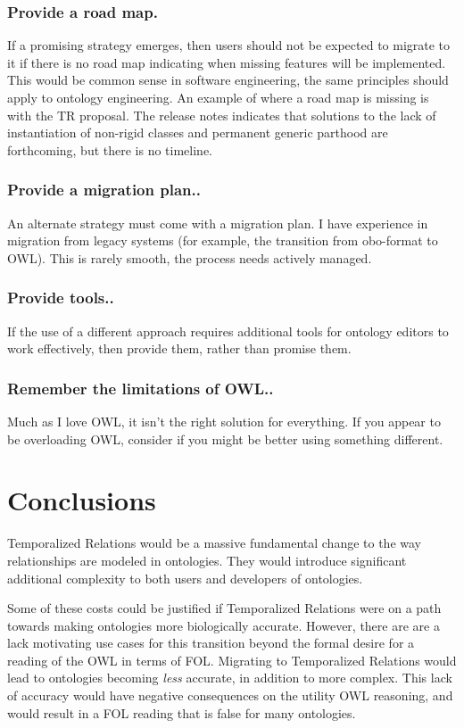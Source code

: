 \documentclass{bioinfo}
\begin{document}
\subsubsection{Provide a road map.} If a promising strategy emerges,
then users should not be expected to migrate to it if there is no road
map indicating when missing features will be implemented. This would
be common sense in software engineering, the same principles should
apply to ontology engineering.  An example of where a road map is
missing is with the TR proposal. The release notes indicates that
solutions to the lack of instantiation of non-rigid classes and
permanent generic parthood are forthcoming, but there is no timeline.

\subsubsection{Provide a migration plan..} An alternate strategy must
come with a migration plan. I have experience in migration from legacy
systems (for example, the transition from obo-format to OWL). This is
rarely smooth, the process needs actively managed.

\subsubsection{Provide tools..} If the use of a different approach
requires additional tools for ontology editors to work effectively,
then provide them, rather than promise them.

\subsubsection{Remember the limitations of OWL..} Much as I love OWL,
it isn't the right solution for everything. If you appear to be
overloading OWL, consider if you might be better using something
different.

\section{Conclusions}

Temporalized Relations would be a massive fundamental change to the
way relationships are modeled in ontologies. They would introduce
significant additional complexity to both users and developers of
ontologies.

Some of these costs could be justified if Temporalized Relations were
on a path towards making ontologies more biologically
accurate. However, there are are a lack motivating use cases for this
transition beyond the formal desire for a reading of the OWL in terms
of FOL. Migrating to Temporalized Relations would lead to ontologies
becoming \emph{less} accurate, in addition to more complex. This lack
of accuracy would have negative consequences on the utility OWL
reasoning, and would result in a FOL reading that is false for many
ontologies.
\end{document}
